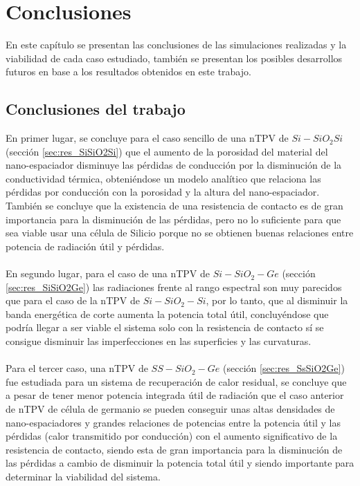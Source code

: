 \chapter{Conclusiones}
En este capítulo se presentan las conclusiones de las simulaciones realizadas y la viabilidad de cada caso estudiado, también se presentan los posibles desarrollos futuros en base a los resultados obtenidos en este trabajo.

\section{Conclusiones del trabajo}
En primer lugar, se concluye para el caso sencillo de una nTPV de $Si-SiO_2Si$ (sección \ref{sec:res_SiSiO2Si}) que el aumento de la porosidad del material del nano-espaciador disminuye las pérdidas de conducción por la disminución de la conductividad térmica, obteniéndose un modelo analítico que relaciona las pérdidas por conducción con la porosidad y la altura del nano-espaciador. También se concluye que la existencia de una resistencia de contacto es de gran importancia para la disminución de las pérdidas, pero no lo suficiente para que sea viable usar una célula de Silicio porque no se obtienen buenas relaciones entre potencia de radiación útil y pérdidas.\\\\
En segundo lugar, para el caso de una nTPV de $Si-SiO_2-Ge$ (sección \ref{sec:res_SiSiO2Ge}) las radiaciones frente al rango espectral son muy parecidos que para el caso de la nTPV de $Si-SiO_2-Si$, por lo tanto, que al disminuir la banda energética de corte aumenta la potencia total útil, concluyéndose que podría llegar a ser viable el sistema solo con la resistencia de contacto sí se consigue disminuir las imperfecciones en las superficies y las curvaturas.\\\\
Para el tercer caso, una nTPV de $SS-SiO_2-Ge$ (sección \ref{sec:res_SsSiO2Ge}) fue estudiada para un sistema de recuperación de calor residual, se concluye que a pesar de tener menor potencia integrada útil de radiación que el caso anterior de nTPV de célula de germanio se pueden conseguir unas altas densidades de nano-espaciadores y grandes relaciones de potencias entre la potencia útil y las pérdidas (calor transmitido por conducción) con el aumento significativo de la resistencia de contacto, siendo esta de gran importancia para la disminución de las pérdidas a cambio de disminuir la potencia total útil y siendo importante para determinar la viabilidad del sistema.\\\\
